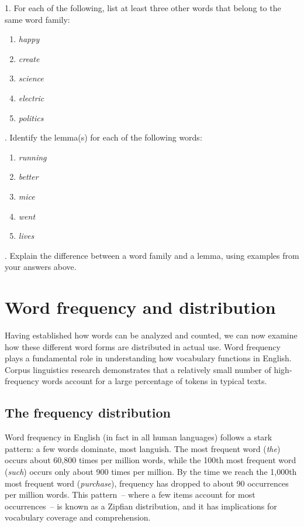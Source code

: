 \begin{tcolorbox}[title=Exercise: Word Families and Lemmas, colback=white, colframe=blue!75!black, fonttitle=\bfseries]
1. For each of the following, list at least three other words that belong to the same word family:

\begin{enumerate}[nosep]
   \item \textit{happy}
   \item \textit{create}
   \item \textit{science}
   \item \textit{electric}
   \item \textit{politics}
\end{enumerate}
. Identify the lemma(s) for each of the following words:

\begin{enumerate}[nosep]
   \item \textit{running}
   \item \textit{better}
   \item \textit{mice}
   \item \textit{went}
   \item \textit{lives}
\end{enumerate}
. Explain the difference between a word family and a lemma, using examples from your answers above.
\end{tcolorbox}

\section{Word frequency and distribution} \label{sec:word-frequency}

Having established how words can be analyzed and counted, we can now examine how these different word forms are distributed in actual use. Word frequency plays a fundamental role in understanding how vocabulary functions in English. Corpus linguistics research demonstrates that a relatively small number of high-frequency words account for a large percentage of tokens in typical texts.

\subsection{The frequency distribution}

Word frequency in English (in fact in all human languages) follows a stark pattern: a few words dominate, most languish. The most frequent word (\textit{the}) occurs about 60,800 times per million words, while the 100th most frequent word (\textit{such}) occurs only about 900 times per million. By the time we reach the 1,000th most frequent word (\textit{purchase}), frequency has dropped to about 90 occurrences per million words. This pattern~-- where a few items account for most occurrences~-- is known as a Zipfian distribution, and it has implications for vocabulary coverage and comprehension.

